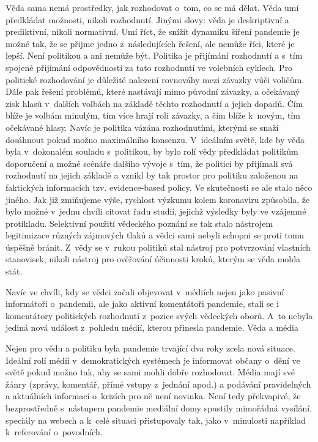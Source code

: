 Věda sama nemá prostředky, jak rozhodovat o~tom, co se má dělat. Věda umí předkládat možnosti, nikoli rozhodnutí. Jinými slovy: věda je deskriptivní a prediktivní, nikoli normativní. Umí říct, že snížit dynamiku šíření pandemie je možné tak, že se přijme jedno z~následujících řešení, ale nemůže říci, které je lepší. Není politikou a ani nemůže být.
Politika je přijímání rozhodnutí a s~tím spojené přijímání odpovědnosti za tato rozhodnutí ve volebních cyklech. Pro politické rozhodování je důležité nalezení rovnováhy mezi závazky vůči voličům. Dále pak řešení problémů, které nastávají mimo původní závazky, a očekávaný zisk hlasů v~dalších volbách na základě těchto rozhodnutí a jejich dopadů. Čím blíže je volbám minulým, tím více hrají roli závazky, a čím blíže k~novým, tím očekávané hlasy. Navíc je politika vázána rozhodnutími, kterými se snaží dosáhnout pokud možno maximálního konsenzu.
V~ideálním světě, kde by věda byla v~dokonalém souladu s~politikou, by bylo rolí vědy předkládat politikům doporučení a možné scénáře dalšího vývoje s~tím, že politici by přijímali svá rozhodnutí na jejich základě a vznikl by tak prostor pro politiku založenou na faktických informacích tzv. evidence-based policy.
Ve skutečnosti se ale stalo něco jiného. Jak již zmiňujeme výše, rychlost výzkumu kolem koronaviru způsobila, že bylo možné v~jednu chvíli citovat řadu studií, jejichž výsledky byly ve vzájemné protikladu. Selektivní použití vědeckého poznání se tak stalo nástrojem legitimizace různých zájmových tlaků a vědci sami nebyli schopni se proti tomu úspěšně bránit. Z~vědy se v~rukou politiků stal nástroj pro potvrzování vlastních stanovisek, nikoli nástroj pro ověřování účinnosti kroků, kterým se věda mohla stát.

Navíc ve chvíli, kdy se vědci začali objevovat v~médiích nejen jako pasivní informátoři o~pandemii, ale jako aktivní komentátoři pandemie, stali se i komentátory politických rozhodnutí z~pozice svých vědeckých oborů. A~to nebyla jediná nová událost z~pohledu médií, kterou přinesla pandemie.
Věda a média

Nejen pro vědu a politiku byla pandemie trvající dva roky zcela nová situace. Ideální rolí médií v~demokratických systémech je informovat občany o~dění ve světě pokud možno tak, aby se sami mohli dobře rozhodovat. Média mají své žánry (zprávy, komentář, přímé vstupy z~jednání apod.) a podávání pravidelných a aktuálních informací o~krizích pro ně není novinka. Není tedy překvapivé, že bezprostředně s~nástupem pandemie mediální domy spustily mimořádná vysílání, speciály na webech a k~celé situaci přistupovaly tak, jako v~minulosti například k~referování o~povodních.

